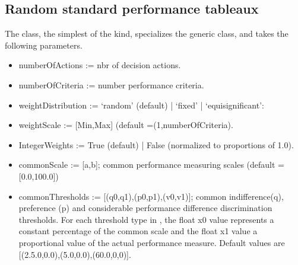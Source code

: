 \documentclass[a4paper,12pt,english]{sphinxhowto}
\begin{document}
\subsection{Random standard performance tableaux}
\label{\detokenize{tutorial:random-standard-performance-tableaux}}
The  class, the simplest of the kind, specializes the generic  class, and takes the following parameters.
\begin{itemize}
\item {} 
numberOfActions := nbr of decision actions.

\item {} 
numberOfCriteria := number performance criteria.

\item {} 
weightDistribution := ‘random’ (default) | ‘fixed’ | ‘equisignificant’:
\begin{quote}

\end{quote}

\item {} 
weightScale := {[}Min,Max{]} (default =(1,numberOfCriteria).

\item {} 
IntegerWeights := True (default) | False (normalized to proportions of 1.0).

\item {} 
commonScale := {[}a,b{]}; common performance measuring scales (default = {[}0.0,100.0{]})

\item {} 
commonThresholds := {[}(q0,q1),(p0,p1),(v0,v1){]}; common indifference(q), preference (p) and considerable performance difference discrimination thresholds. For each threshold type  in , the float x0 value represents a constant percentage of the common scale and the float x1 value a proportional value of the actual performance measure. Default values are {[}(2.5.0,0.0),(5.0,0.0),(60.0,0,0){]}.


\end{itemize}
\end{document}

